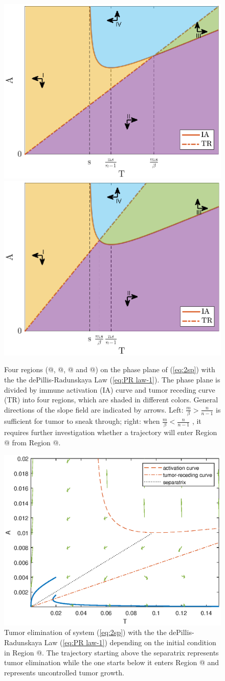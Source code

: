\documentclass[review,authoryear]{elsarticle}
\makeatletter
\newcommand*{\rom}[1]{\expandafter\@slowromancap\romannumeral #1@}
\makeatother
\begin{document}
\begin{figure}
\centerline{\includegraphics[width=0.5\linewidth]{figs/dP-colored-regions-l}\includegraphics[width=0.5\linewidth]{figs/dP-colored-regions-r}}

\caption{\label{fig:dP-PP-4regions}
Four regions (\rom{1}, \rom{2}, \rom{3} and \rom{4}) on the phase plane of (\ref{eq:2sp}) with the the dePillis-Radunskaya Law (\ref{eq:PR law-1}). The phase plane is divided by immune activation (IA) curve and tumor receding curve (TR) into four regions, which are 
shaded in different colors. General directions of the slope field
are indicated by arrows. Left: $\frac{m}{\beta}>\frac{n}{n-1}$
is sufficient for tumor to sneak through; right: when $\frac{m}{\beta}<\frac{n}{n-1}$
, it requires further investigation whether a trajectory will enter
Region \rom{3} from Region \rom{2}. }
\end{figure}

\begin{figure}
\centerline{\includegraphics[width=0.7\linewidth]{figs/dP-PP-sep}}

\caption{\label{fig:dP-PP-sep}Tumor elimination of system (\ref{eq:2sp}) with the the dePillis-Radunskaya Law (\ref{eq:PR law-1}) depending on the initial condition
in Region \rom{1}. The trajectory starting above the separatrix represents tumor
elimination while the one starts below it enters Region \rom{2} and represents
uncontrolled tumor growth. }
\end{figure}
\end{document}
